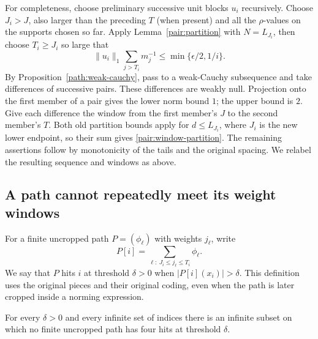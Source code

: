 For completeness, choose preliminary successive unit blocks $u_i$
recursively.  Choose $J_i>J$, also larger than the preceding $T$ (when
present) and all the $\rho$-values on the supports chosen so far.  Apply
Lemma~\ref{pair:partition} with $N=L_{J_i}$, then choose $T_i\ge J_i$ so
large that
\[
 \|u_i\|_1\sum_{j>T_i}m_j^{-1}\le\min\{\epsilon/2,1/i\}.
\]
By Proposition~\ref{path:weak-cauchy}, pass to a weak-Cauchy subsequence and
take differences of successive pairs.  These differences are weakly null.
Projection onto the first member of a pair gives the lower norm bound $1$;
the upper bound is $2$.  Give each difference the window from the first
member's $J$ to the second member's $T$.  Both old partition bounds apply
for $d\le L_{J_i}$, where $J_i$ is the new lower endpoint, so their sum gives
\eqref{pair:window-partition}.  The remaining assertions follow by
monotonicity of the tails and the original spacing.  We relabel the
resulting sequence and windows as above.

\subsection{A path cannot repeatedly meet its weight windows}

For a finite uncropped path $P=(\phi_\ell)$ with weights $j_\ell$, write
\[
 P[i]=\sum_{\ell:\ J_i\le j_\ell\le T_i}\phi_\ell.
\]
We say that $P$ hits $i$ at threshold $\delta>0$ when
$|P[i](x_i)|>\delta$.  This definition uses the original pieces and their
original coding, even when the path is later cropped inside a norming
expression.

\begin{lemma}\label{pair:four-hits}
For every $\delta>0$ and every infinite set of indices there is an infinite
subset on which no finite uncropped path has four hits at threshold
$\delta$.
\end{lemma}

